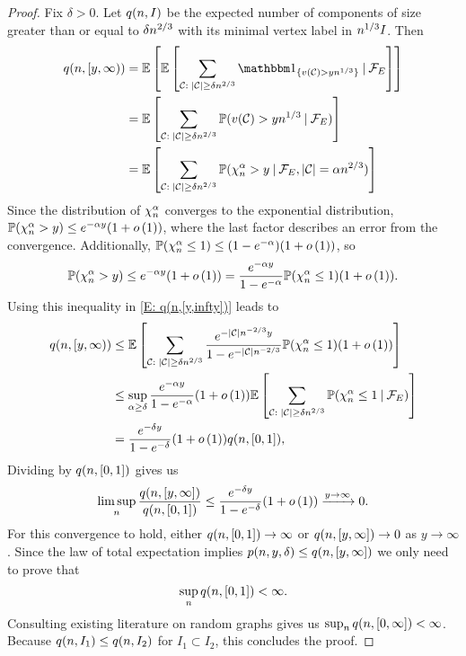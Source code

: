 \begin{proof}
	Fix $\delta > 0$.
	Let $q(n,I)$ be the expected number of components of size greater than or equal to $\delta n^{2 / 3}$ 
	with its minimal vertex label in $n^{1 / 3}I$.
	Then
	\begin{equation} \label{E: q(n,[y,infty])}
	\begin{aligned}
	\NComp{[y, \infty)}
	&= \ExpBig{ \ExpBig{ \sum_{\Ccal: \; |\Ccal| \geq \delta\n{2}{3}} \Ind{\{ v(\Ccal) > y\n{1}{3} \}} \cond \SigmaAlgebra_E } } \\
	&= \ExpBig{ \sum_{\Ccal: \; |\Ccal| \geq \delta\n{2}{3}} \Prob( v(\Ccal) > y\n{1}{3} \cond \SigmaAlgebra_E) } \\
	&= \ExpBig{ \sum_{\Ccal: \; |\Ccal| \geq \delta\n{2}{3}} \Prob(\ChiAn > y \cond \SigmaAlgebra_E, |\Ccal| = \alpha\n{2}{3}) }
	\end{aligned}
	\end{equation}
	Since the distribution of $\chi^\alpha_n$ converges to the exponential distribution,
	$\mathbb{P}(\chi^\alpha_n > y) \leq e^{-\alpha y} (1+ o\left(1\right))$,
	where the last factor describes an error from the convergence.
	Additionally, $\mathbb{P}(\chi^\alpha_n \leq 1) \leq (1 - e^{-\alpha}) (1+ o\left(1\right))$,
	so
	\begin{equation}
	\mathbb{P}(\chi^\alpha_n > y) \leq e^{-\alpha y} (1+ o\left(1\right)) = \frac{e^{-\alpha y}}{1 - e^{-\alpha}} \mathbb{P}(\chi^\alpha_n \leq 1) (1 + o\left(1\right)).
	\end{equation}
	Using this inequality in \eqref{E: q(n,[y,infty])} leads to
	\begin{equation}
	\begin{aligned}
	q(n,[y, \infty))
	&\leq \mathbb{E} \left[  \sum_{\mathcal{C}: \; |\mathcal{C}| \geq \delta n^{2 / 3}}
		\frac{e^{-|\mathcal{C}|n^{-2 / 3}y}}{1-e^{-|\mathcal{C}|n^{-2 / 3}}} \mathbb{P}(\chi^\alpha_n \leq 1) (1 + o\left(1\right))  \right] \\
	&\leq \sup_{\alpha \geq \delta} \frac{e^{-\alpha y}}{1-e^{-\alpha}} (1 + o\left(1\right)) 
		\mathbb{E} \left[  \sum_{\mathcal{C}: \; |\mathcal{C}| \geq \delta n^{2 / 3}} \mathbb{P}(\chi^\alpha_n \leq 1 \: | \: \mathcal{F}_E )  \right] \\
	&= \frac{e^{-\delta y}}{1-e^{-\delta}} (1 + o\left(1\right)) q(n,[0,1]),
	\end{aligned}
	\end{equation}
	Dividing by $q(n,[0,1])$ gives us
	\begin{equation}
	\limsup_n \frac{q(n,[y,\infty])}{q(n,[0,1])} \leq \frac{e^{-\delta y}}{1-e^{-\delta}} (1 + o\left(1\right)) \xrightarrow{y \rightarrow \infty} 0.
	\end{equation}
	For this convergence to hold,
	either $q(n,[0,1]) \rightarrow \infty$ or $q(n,[y,\infty]) \rightarrow 0$ as $y \rightarrow \infty$.
	Since the law of total expectation implies $p(n,y,\delta) \leq q(n,[y,\infty])$
	we only need to prove that
	\begin{equation}
	\sup_n q(n,[0,1]) < \infty.
	\end{equation}
	Consulting existing literature on random graphs gives us $\sup_n q(n,[0, \infty]) < \infty$.
	Because $q(n,I_1) \leq q(n,I_2)$ for $I_1 \subset I_2$,
	this concludes the proof.
	

\end{proof}
